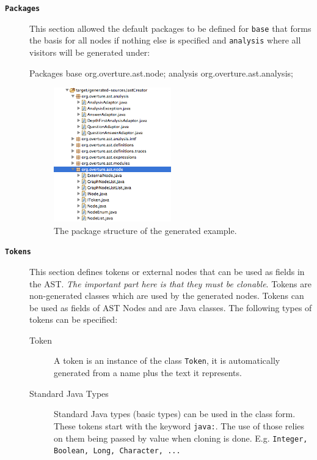 \begin{description}

\item[\textbf{\texttt{Packages}}] This section allowed the default packages to be defined for \texttt{base} that forms the basis for all nodes if nothing else is specified and \texttt{analysis} where all visitors will be generated under:

\begin{astlst}
Packages
base org.overture.ast.node;
analysis org.overture.ast.analysis;
\end{astlst}


\begin{figure}[h]

  \centering
    \includegraphics[width=0.5\textwidth]{figures/packageOutput}
      \caption{The package structure of the generated example.}
\end{figure}

\item[\textbf{\texttt{Tokens}}] This section defines tokens or external nodes that can be used as fields in the AST. \textit{The important part here is that they must be clonable}. Tokens  are non-generated classes which are used by the generated nodes. Tokens can be used as fields of AST Nodes and are Java classes. The following types of tokens can be specified:
\begin{description}
\item [Token] A token is an instance of the class \texttt{Token}, it is automatically generated from a name plus the text it represents.

\item [Standard Java Types] Standard Java types (basic types) can be used in the class form. These tokens start with the keyword \texttt{java:}. The use of those relies on them being passed by value when cloning is done. E.g. \texttt{Integer, Boolean, Long, Character, ...}


\end{description}
\end{description}
